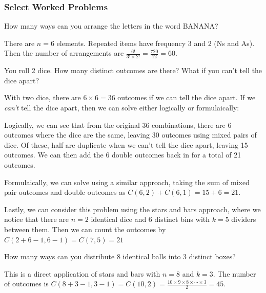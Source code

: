 \subsubsection{Select Worked Problems}

\begin{problem}
How many ways can you arrange the letters in the word BANANA?
\end{problem}

\begin{solution}
There are $n = 6$ elements. Repeated items have frequency 3 and 2 (Ns and As). Then the number of arrangements are $\frac{6!}{3! \times 2!} = \frac{720}{12} = 60$.
\end{solution}

\medskip

\begin{problem}
You roll 2 dice. How many distinct outcomes are there? What if you can't tell the dice apart?
\end{problem}

\begin{solution}
With two dice, there are $6 \times 6 = 36$ outcomes if we can tell the dice apart. If we \textit{can't} tell the dice apart, then we can solve either logically or formulaically:

Logically, we can see that from the original 36 combinations, there are 6 outcomes where the dice are the same, leaving 30 outcomes using mixed pairs of dice. Of these, half are duplicate when we can't tell the dice apart, leaving 15 outcomes. We can then add the 6 double outcomes back in for a total of 21 outcomes.

Formulaically, we can solve using a similar approach, taking the sum of mixed pair outcomes and double outcomes as $C(6, 2) + C(6, 1) = 15 + 6 = 21$.

Lastly, we can consider this problem using the stars and bars approach, where we notice that there are $n=2$ identical dice and $6$ distinct bins with $k=5$ dividers between them. Then we can count the outcomes by $C(2 + 6 - 1, 6 -1) = C(7, 5) = 21$
\end{solution}

\medskip

\begin{problem}
How many ways can you distribute 8 identical balls into 3 distinct boxes?
\end{problem}

\begin{solution}
This is a direct application of stars and bars with $n=8$ and $k=3$. The number of outcomes is $C(8+3-1, 3-1) = C(10,2) = \frac{10 \times 9 \times 8 \times \cdots \times 3}{2} = 45$.
\end{solution}

